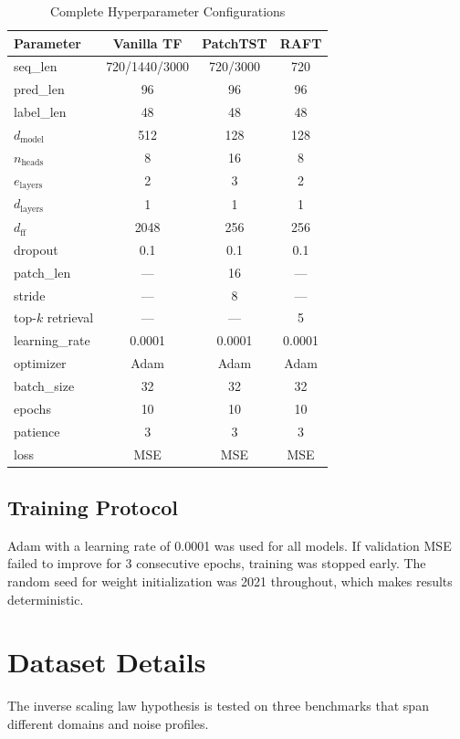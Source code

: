 \documentclass{article} %
\begin{document}
\begin{table}[h]
\centering
\caption{Complete Hyperparameter Configurations}
\label{tab:hyperparams}
\scriptsize
\begin{tabular}{lccc}
\toprule
\textbf{Parameter} & \textbf{Vanilla TF} & \textbf{PatchTST} & \textbf{RAFT} \\
\midrule
seq\_len & 720/1440/3000 & 720/3000 & 720 \\
pred\_len & 96 & 96 & 96 \\
label\_len & 48 & 48 & 48 \\
$d_{\text{model}}$ & 512 & 128 & 128 \\
$n_{\text{heads}}$ & 8 & 16 & 8 \\
$e_{\text{layers}}$ & 2 & 3 & 2 \\
$d_{\text{layers}}$ & 1 & 1 & 1 \\
$d_{\text{ff}}$ & 2048 & 256 & 256 \\
dropout & 0.1 & 0.1 & 0.1 \\
patch\_len & --- & 16 & --- \\
stride & --- & 8 & --- \\
top-$k$ retrieval & --- & --- & 5 \\
\midrule
learning\_rate & 0.0001 & 0.0001 & 0.0001 \\
optimizer & Adam & Adam & Adam \\
batch\_size & 32 & 32 & 32 \\
epochs & 10 & 10 & 10 \\
patience & 3 & 3 & 3 \\
loss & MSE & MSE & MSE \\
\bottomrule
\end{tabular}
\end{table}

\subsection{Training Protocol}

Adam with a learning rate of 0.0001 was used for all models. If validation MSE failed to improve for 3 consecutive epochs, training was stopped early. The random seed for weight initialization was 2021 throughout, which makes results deterministic.

\section{Dataset Details}

The inverse scaling law hypothesis is tested on three benchmarks that span different domains and noise profiles.
\end{document}
